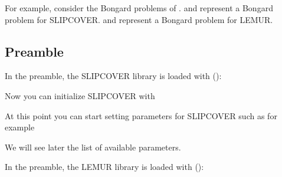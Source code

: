 \documentclass[letterpaper,10pt,english]{sphinxmanual}
\begin{document}
For example, consider the Bongard problems of .  and  represent a Bongard problem for SLIPCOVER.
 and  represent a Bongard problem for LEMUR.


\subsection{Preamble}
\label{\detokenize{index:preamble}}
In the preamble, the SLIPCOVER library is loaded with ():

\begin{sphinxVerbatim}[commandchars=\\\{\}]
 
\end{sphinxVerbatim}

Now you can initialize SLIPCOVER with

\begin{sphinxVerbatim}[commandchars=\\\{\}]
 
\end{sphinxVerbatim}

At this point you can start setting parameters for SLIPCOVER such as for example

\begin{sphinxVerbatim}[commandchars=\\\{\}]
 
 
 
 
\end{sphinxVerbatim}

We will see later the list of available parameters.

In the preamble, the LEMUR library is loaded with ():
\end{document}
